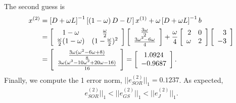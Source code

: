 \begin{questions}
\begin{solution}
\begin{itemize}
The second guess is
\begin{align*}
x^{(2)}&=\left[D+\omega L\right]^{-1}\left[\left(1-\omega\right)D-U\right]x^{(1)}+\omega \left[D+\omega L\right]^{-1}b\\
&=\left[
	\begin{array}{c c} 
	1-\omega & \frac{\omega}{2} \\
	\frac{\omega}{2}(1-\omega) & (1-\frac{\omega}{2})^2\\
	\end{array} \right]\left[
	\begin{array}{c c} 
	\frac{3\omega}{2} \\
	\frac{3\omega^2-6\omega}{4} \\
	\end{array} \right]+\frac{\omega}{4}\left[
	\begin{array}{r r} 
	2 & 0 \\
	\omega & 2 \\
	\end{array} \right]\left[
	\begin{array}{r r} 
	3 \\
	-3 \\
	\end{array} \right]\\
	&=\left[
	\begin{array}{c c} 
	\frac{3\omega(\omega^2-6\omega+8)}{8} \\
	\frac{3\omega(\omega^3-10\omega^2+20\omega-16)}{16}\\
	\end{array} \right]=\left[
	\begin{array}{c c} 
	1.0924 \\
	-0.9687\\
	\end{array} \right].
\end{align*}
Finally, we compute the 1 error norm, $||e_{SOR}^{(2)}||_1=0.1237$. As expected,
\begin{align*}
e_{SOR}^{(2)}||_1<||e_{GS}^{(2)}||_1<||e_{J}^{(2)}||_1.
\end{align*}
\end{itemize}
\end{solution}
\end{questions}
